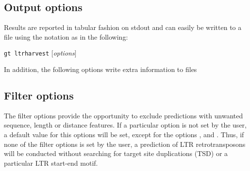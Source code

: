 \documentclass[12pt,titlepage]{article}
\newcommand{\Gtltrharvest}{\texttt{gt ltrharvest}\xspace}
\begin{document}
\subsection{Output options}

Results are reported in tabular fashion on stdout and can easily
be written to a file using the notation \texttt{} 
 as in the following:

\Gtltrharvest {}  
$[$\emph{options}$]$ \texttt{}  

In addition, the following options write extra information to files
\begin{Justshowoptions}




\end{Justshowoptions}


\subsection{Filter options}

The filter options provide the opportunity to exclude predictions with unwanted
sequence, length or distance features. If a particular option is not set 
by the user, a default value for this options will be set, 
except for the options ,  
and . Thus, if none of the filter options is set by the user,
a prediction of LTR retrotransposons will be
conducted without searching for target site duplications (TSD) or a particular
LTR start-end motif.
\end{document}
